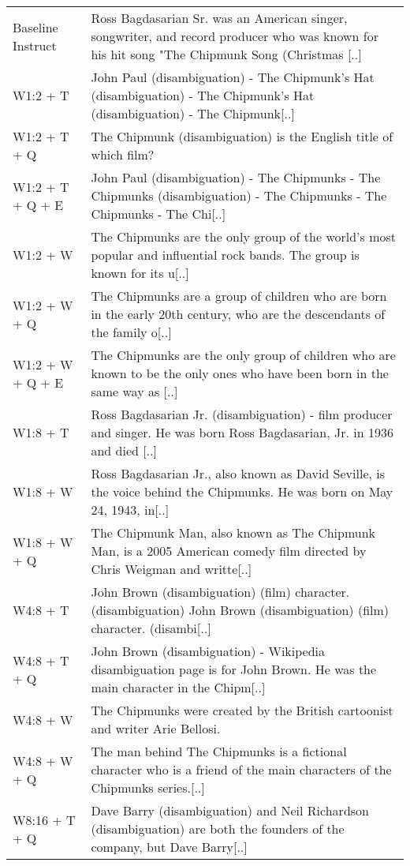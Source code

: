 {\begin{longtable}{lp{8cm}}
\hline
\endlastfoot
Baseline Instruct & Ross Bagdasarian Sr. was an American singer, songwriter, and record producer who was known for his hit song "The Chipmunk Song (Christmas [..] \\
W1:2 + T & John Paul (disambiguation) - The Chipmunk's Hat (disambiguation) - The Chipmunk's Hat (disambiguation) - The Chipmunk[..] \\
W1:2 + T + Q & The Chipmunk (disambiguation) is the English title of which film? \\
W1:2 + T + Q + E & John Paul (disambiguation) - The Chipmunks - The Chipmunks (disambiguation) - The Chipmunks - The Chipmunks - The Chi[..] \\
W1:2 + W & The Chipmunks are the only group of the world's most popular and influential rock bands. The group is known for its u[..] \\
W1:2 + W + Q & The Chipmunks are a group of children who are born in the early 20th century, who are the descendants of the family o[..] \\
W1:2 + W + Q + E & The Chipmunks are the only group of children who are known to be the only ones who have been born in the same way as [..] \\
W1:8 + T & Ross Bagdasarian Jr. (disambiguation) - film producer and singer. He was born Ross Bagdasarian, Jr. in 1936 and died [..] \\
W1:8 + W & Ross Bagdasarian Jr., also known as David Seville, is the voice behind the Chipmunks. He was born on May 24, 1943, in[..] \\
W1:8 + W + Q & The Chipmunk Man, also known as The Chipmunk Man, is a 2005 American comedy film directed by Chris Weigman and writte[..] \\
W4:8 + T & John Brown (disambiguation) (film) character. (disambiguation) John Brown (disambiguation) (film) character. (disambi[..] \\
W4:8 + T + Q & John Brown (disambiguation) - Wikipedia disambiguation page is for John Brown. He was the main character in the Chipm[..] \\
W4:8 + W & The Chipmunks were created by the British cartoonist and writer Arie Bellosi.  \\
W4:8 + W + Q & The man behind The Chipmunks is a fictional character who is a friend of the main characters of the Chipmunks series.[..] \\
W8:16 + T + Q & Dave Barry (disambiguation) and Neil Richardson (disambiguation) are both the founders of the company, but Dave Barry[..] \\

\end{longtable}}
